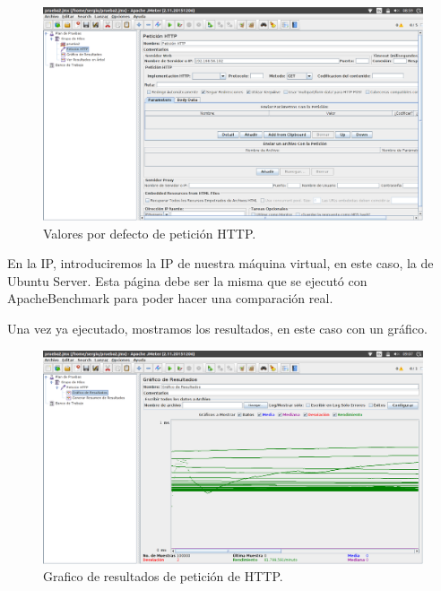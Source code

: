 \begin{figure}[H] %
	\centering
	\includegraphics[scale=0.35]{imagenes/peticion-us.png}  %
	\caption{Valores por defecto de petición HTTP.}
\end{figure}

En la IP, introduciremos la IP de nuestra máquina virtual, en este caso, la de Ubuntu Server. Esta página debe ser la misma que se ejecutó con ApacheBenchmark para poder hacer una comparación real.

Una vez ya ejecutado, mostramos los resultados, en este caso con un gráfico.

\begin{figure}[H] %
	\centering
	\includegraphics[scale=0.35]{imagenes/grafico.png}  %
	\caption{Grafico de resultados de petición de HTTP.}
\end{figure}

